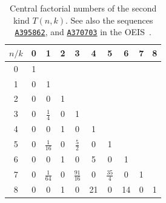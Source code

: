 \begin{table}[H]
  \begin{center}
    \setlength\extrarowheight{-6pt}
    \begin{tabular}{c|ccccccccc}
      $n/k$ & 0 & 1 & 2 & 3 & 4 & 5 & 6 & 7 & 8 \\ [3px]
      \hline
      0 & 1 &   &   &   &   &   &   &   &   \\
      1 & 0 & 1 &   &   &   &   &   &   &   \\
      2 & 0 & 0 & 1 &   &   &   &   &   &   \\
      3 & 0 & $\tfrac{1}{4}$ & 0 & 1 &   &   &   &   &   \\
      4 & 0 & 0 & 1 & 0 & 1 &   &   &   &   \\
      5 & 0 & $\tfrac{1}{16}$ & 0 & $\tfrac{5}{2}$ & 0 & 1 &   &   &   \\
      6 & 0 & 0 & 1 & 0 & 5 & 0 & 1 &   &   \\
      7 & 0 & $\tfrac{1}{64}$ & 0 & $\tfrac{91}{16}$ & 0 & $\tfrac{35}{4}$ & 0 & 1 &   \\
      8 & 0 & 0 & 1 & 0 & 21 & 0 & 14 & 0 & 1 \\
    \end{tabular}
  \end{center}
  \caption{Central factorial numbers of the second kind $T(n,k)$.
    See also the sequences \href{https://oeis.org/A395862}{\texttt{A395862}},
    and \href{https://oeis.org/A370703}{\texttt{A370703}} in the OEIS~\cite{sloane2003line}.
  }
  \label{tab:central-factorial-numbers-t0}
\end{table}
